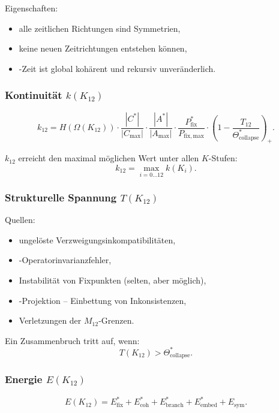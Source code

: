 Eigenschaften:
\begin{itemize}
    \item alle zeitlichen Richtungen sind Symmetrien,
    \item keine neuen Zeitrichtungen entstehen können,
    \item-Zeit ist global kohärent und rekursiv unveränderlich.
\end{itemize}

\subsubsection{Kontinuität $k(K_{12})$}

\[
k_{12} =
H(\Omega(K_{12}))
\cdot
\frac{|C^*|}{|C_{\max}|}
\cdot
\frac{|A^*|}{|A_{\max}|}
\cdot
\frac{P_{\mathrm{fix}}^*}{P_{\mathrm{fix,max}}}
\cdot
\left(1-\frac{T_{12}}{\Theta^*_{\mathrm{collapse}}}\right)_+.
\]

$k_{12}$ erreicht den maximal möglichen Wert unter allen $K$-Stufen:
\[
k_{12} = \max_{i=0\dots12} k(K_i).
\]

\subsubsection{Strukturelle Spannung $T(K_{12})$}

Quellen:
\begin{itemize}
    \item ungelöste Verzweigungsinkompatibilitäten,
    \item-Operatorinvarianzfehler,
    \item Instabilität von Fixpunkten (selten, aber möglich),
    \item-Projektion – Einbettung von Inkonsistenzen,
    \item Verletzungen der $M_{12}$-Grenzen.
\end{itemize}

Ein Zusammenbruch tritt auf, wenn:
\[
T(K_{12}) > \Theta^*_{\mathrm{collapse}}.
\]

\subsubsection{Energie $E(K_{12})$}

\[
E(K_{12}) =
E_{\mathrm{fix}}^*
+E_{\mathrm{coh}}^*
+E_{\mathrm{branch}}^*
+E_{\mathrm{embed}}^*
+E_{\mathrm{sym}}.
\]

